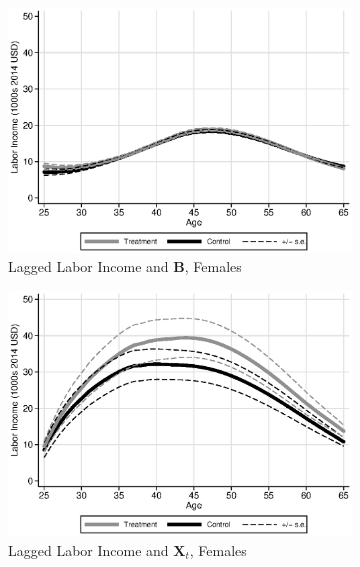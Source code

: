 \begin{figure}
\centering
\caption{Predicted Labor Income Profiles, Varying the Predictor Variables}\label{fig:predictsensitivity}
\begin{subfigure}[h]{0.3\textwidth}
		\centering
		\caption{Lagged Labor Income and $\bm{B}$, Females}
		\includegraphics[width=\textwidth]{output/labor_25-65_pset3_mset3_female.eps}
\end{subfigure}%
\begin{subfigure}[h]{0.3\textwidth}
	\centering
	\caption{Lagged Labor Income and $\bm{X}_{t}$, Females}
		\includegraphics[width=\textwidth]{output/labor_25-65_pset6_mset3_female.eps}
\end{subfigure}%
\begin{subfigure}[h]{0.3\textwidth}
	\centering

\end{subfigure}
\end{figure}
